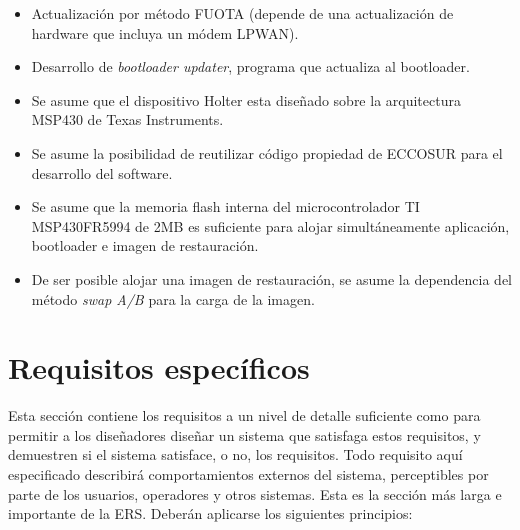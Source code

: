 \documentclass[12pt,a4paper]{article}
\begin{document}
\begin{itemize}
	\item Actualización por método FUOTA (depende de una actualización de hardware que incluya un módem LPWAN).
	
	\item Desarrollo de \textit{bootloader updater}, programa que actualiza al bootloader.

	\item Se asume que el dispositivo Holter esta diseñado sobre la arquitectura MSP430 de Texas Instruments.

	\item Se asume la posibilidad de reutilizar código propiedad de ECCOSUR para el desarrollo del software.

	\item Se asume que la memoria flash interna del microcontrolador TI MSP430FR5994 de 2MB es suficiente para alojar simultáneamente aplicación, bootloader e imagen de restauración.

	\item De ser posible alojar una imagen de restauración, se asume la dependencia del método \textit{swap A/B} para la carga de la imagen.
\end{itemize}


\section{Requisitos específicos}
\label{sec:specific_requirements}

Esta sección contiene los requisitos a un nivel de detalle suficiente
como para permitir a los diseñadores diseñar un sistema que
satisfaga estos requisitos, y demuestren si el sistema satisface, o
no, los requisitos. Todo requisito aquí especificado describirá
comportamientos externos del sistema, perceptibles por parte de los
usuarios, operadores y otros sistemas. Esta es la sección más larga
e importante de la ERS. Deberán aplicarse los siguientes principios:
\end{document}
